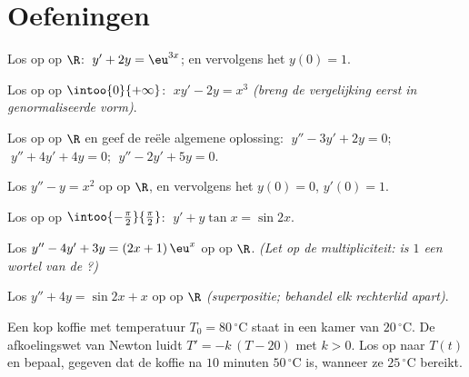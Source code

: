 \section{Oefeningen}

\begin{exercise}[$\star$]\label{exo:b1:diffeq:1}
Los op op $\R$: $\;y' + 2y = \eu^{3x}$; en vervolgens het
 $y(0) = 1$.
\end{exercise}

\begin{exercise}[$\star$]\label{exo:b1:diffeq:2}
Los op op $\intoo{0}{+\infty}$: $\;x y' - 2y = x^3$ \emph{(breng de
vergelijking eerst in genormaliseerde vorm)}.
\end{exercise}

\begin{exercise}[$\star$]\label{exo:b1:diffeq:3}
Los op op $\R$ en geef de reële algemene oplossing:
$\;y'' - 3y' + 2y = 0$; $\;y'' + 4y' + 4y = 0$; $\;y'' - 2y' + 5y = 0$.
\end{exercise}

\begin{exercise}[$\star$]\label{exo:b1:diffeq:4}
Los $y'' - y = x^2$ op op $\R$, en vervolgens het  $y(0) =
0$, $y'(0) = 1$.
\end{exercise}

\begin{exercise}[$\star\star$]\label{exo:b1:diffeq:5}
Los op op $\intoo{-\frac\pi2}{\frac\pi2}$: $\;y' + y\tan x = \sin 2x$.
\end{exercise}

\begin{exercise}[$\star\star$]\label{exo:b1:diffeq:6}
Los $y'' - 4y' + 3y = (2x + 1)\,\eu^{x}$ op op $\R$. \emph{(Let op de
multipliciteit: is $1$ een wortel van de ?)}
\end{exercise}

\begin{exercise}[$\star\star$]\label{exo:b1:diffeq:7}
Los $y'' + 4y = \sin 2x + x$ op op $\R$ \emph{(superpositie; behandel
elk rechterlid apart)}.
\end{exercise}

\begin{exercise}[$\star\star$]\label{exo:b1:diffeq:8}
Een kop koffie met temperatuur $T_0 = 80\,^\circ$C staat in een kamer van
$20\,^\circ$C. De afkoelingswet van Newton luidt $T' = -k\,(T - 20)$ met
$k > 0$. Los op naar $T(t)$ en bepaal, gegeven dat de koffie na $10$
minuten $50\,^\circ$C is, wanneer ze $25\,^\circ$C bereikt.
\end{exercise}

